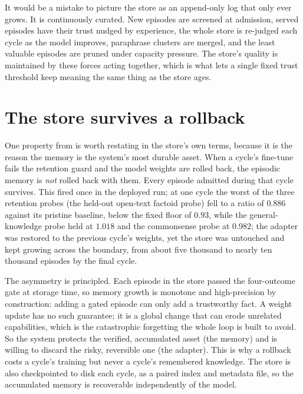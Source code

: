 \begin{pitfall}
It would be a mistake to picture the store as an append-only log that only ever grows.
It is continuously curated. New episodes are screened at admission, served episodes have
their trust nudged by experience, the whole store is re-judged each cycle as the model
improves, paraphrase clusters are merged, and the least valuable episodes are pruned
under capacity pressure. The store's quality is maintained by these forces acting
together, which is what lets a single fixed trust threshold keep meaning the same thing
as the store ages.
\end{pitfall}

\section{The store survives a rollback}
\label{sec:memory-asymmetry}

One property from  is worth restating in the store's own terms,
because it is the reason the memory is the system's most durable asset. When a cycle's
fine-tune fails the retention guard and the model weights are rolled back, the episodic
memory is \emph{not} rolled back with them. Every episode admitted during that cycle
survives. This fired once in the deployed run; at one cycle the worst of the three
retention probes (the held-out open-text factoid probe) fell to a ratio of $0.886$
against its pristine baseline, below the fixed floor of $0.93$, while the
general-knowledge probe held at $1.018$ and the commonsense probe at $0.982$; the
adapter was restored to the previous cycle's weights, yet the store was untouched and
kept growing across the boundary, from about five thousand to nearly ten thousand
episodes by the final cycle.

\begin{precise}
The asymmetry is principled. Each episode in the store passed the four-outcome gate at
storage time, so memory growth is monotone and high-precision by construction: adding a
gated episode can only add a trustworthy fact. A weight update has no such guarantee; it
is a global change that can erode unrelated capabilities, which is the catastrophic
forgetting the whole loop is built to avoid. So the system protects the verified,
accumulated asset (the memory) and is willing to discard the risky, reversible one (the
adapter). This is why a rollback costs a cycle's training but never a cycle's
remembered knowledge. The store is also checkpointed to disk each cycle, as a paired
index and metadata file, so the accumulated memory is recoverable independently of the
model.
\end{precise}


